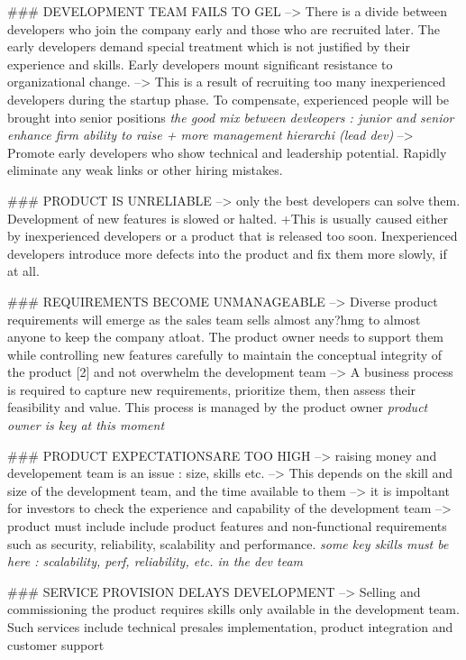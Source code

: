\begin{itemize}
\begin{itemize}
  ### DEVELOPMENT TEAM FAILS TO GEL
  --> There is a divide between developers who join the company early and those who are recruited later. The early developers demand special treatment which is not justified by their experience and skills. Early developers mount significant resistance to organizational change.
  --> This is a result of recruiting too many inexperienced developers during the startup phase. To compensate, experienced people will be brought into senior positions \textit{the good mix between devleopers : junior and senior enhance firm ability to raise + more management hierarchi (lead dev)}
  --> Promote early developers who show technical and leadership potential. Rapidly eliminate any weak links or other hiring mistakes.

  ### PRODUCT IS UNRELIABLE
  --> only the best developers can solve them. Development of new features is slowed or halted. +This is usually caused either by inexperienced developers or a product that is released too soon. Inexperienced developers introduce more defects into the product and fix them more slowly, if at all.

  ### REQUIREMENTS BECOME UNMANAGEABLE
  --> Diverse product requirements will emerge as the sales team sells almost any?hmg to almost anyone to keep the company atloat. The product owner needs to support them while controlling new features carefully to maintain the conceptual integrity of the product [2] and not overwhelm the development team
  --> A business process is required to capture new requirements, prioritize them, then assess their feasibility and value. This process is managed by the product owner \textit{product owner is key at this moment}

  ### PRODUCT EXPECTATIONSARE TOO HIGH
  --> raising money and developement team is an issue : size, skills etc.
  --> This depends on the skill and size of the development team, and the time available to them
  --> it is impoltant for investors to check the experience and capability of the development team
  --> product must include include product features and non-functional requirements such as security, reliability, scalability and performance. \textit{some key skills must be here : scalability, perf, reliability, etc. in the dev team}

  ### SERVICE PROVISION DELAYS DEVELOPMENT
  --> Selling and commissioning the product requires skills only available in the development team. Such services include technical presales implementation, product integration and customer support


\end{itemize}
\end{itemize}
